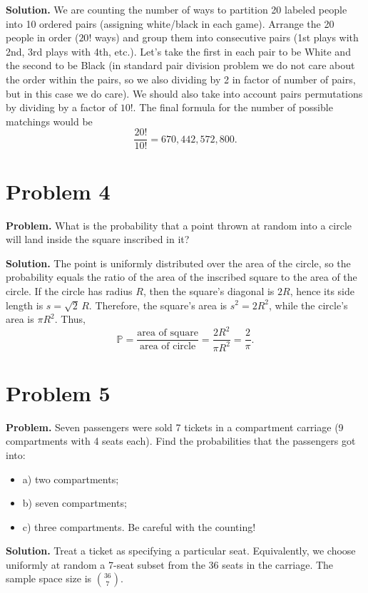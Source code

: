 \documentclass{article}
\begin{document}
\textbf{Solution.} We are counting the number of ways to partition 20 labeled people into 10 ordered pairs (assigning white/black in each game). Arrange the 20 people in order ($20!$ ways) and group them into consecutive pairs (1st plays with 2nd, 3rd plays with 4th, etc.). Let's take the first in each pair to be White and the second to be Black (in standard pair division problem we do not care about the order within the pairs, so we also dividing by 2 in factor of number of pairs, but in this case we do care). We should also take into account pairs permutations by dividing by a factor of $10!$. The final formula for the number of possible matchings would be
\[
\frac{20!}{10!}=670{,}442{,}572{,}800.
\]
\section{Problem 4}

\textbf{Problem.} What is the probability that a point thrown at random into a circle will land inside the square inscribed in it?

\textbf{Solution.} The point is uniformly distributed over the area of the circle, so the probability equals the ratio of the area of the inscribed square to the area of the circle. If the circle has radius $R$, then the square's diagonal is $2R$, hence its side length is $s = \sqrt{2}\,R$. Therefore, the square's area is $s^2 = 2R^2$, while the circle's area is $\pi R^2$. Thus,
\[
\mathbb{P} = \frac{\text{area of square}}{\text{area of circle}} = \frac{2R^2}{\pi R^2} = \frac{2}{\pi}.
\]
\section{Problem 5}

\textbf{Problem.} Seven passengers were sold 7 tickets in a compartment carriage (9 compartments with 4 seats each). Find the probabilities that the passengers got into:
\begin{itemize}
\item a) two compartments;
\item b) seven compartments;
\item c) three compartments. Be careful with the counting!
\end{itemize}

\textbf{Solution.} Treat a ticket as specifying a particular seat. Equivalently, we choose uniformly at random a 7-seat subset from the 36 seats in the carriage. The sample space size is \(\binom{36}{7}\).
\end{document}
